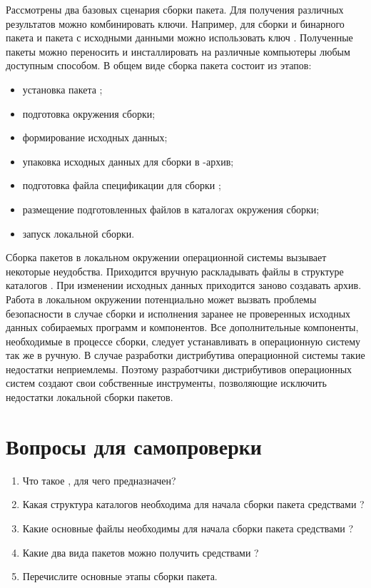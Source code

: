 Рассмотрены два базовых сценария сборки пакета. Для получения различных результатов можно комбинировать ключи.
Например, для сборки и бинарного пакета и пакета с исходными данными можно использовать ключ .
Полученные пакеты можно переносить и инсталлировать на различные компьютеры любым доступным способом.
В общем виде сборка пакета состоит из этапов:
\begin{itemize}
\item установка пакета ;
\item подготовка окружения сборки;
\item формирование исходных данных;
\item упаковка исходных данных для сборки в -архив;
\item подготовка файла спецификации для сборки ;
\item размещение подготовленных файлов в каталогах окружения сборки;
\item запуск локальной сборки.
\end{itemize}

Сборка пакетов в локальном окружении операционной системы вызывает некоторые неудобства.
Приходится вручную раскладывать файлы в структуре каталогов . При изменении
исходных данных приходится заново создавать архив. Работа в локальном окружении потенциально
может вызвать проблемы безопасности в случае сборки и исполнения заранее не проверенных исходных
данных собираемых программ и компонентов. Все дополнительные компоненты, необходимые
в процессе сборки, следует устанавливать в операционную систему так же в ручную.
В случае разработки дистрибутива операционной системы такие недостатки неприемлемы.
Поэтому разработчики дистрибутивов операционных систем создают свои собственные инструменты,
позволяющие исключить недостатки локальной сборки пакетов.

\section{Вопросы для самопроверки}

\begin{enumerate}
	\item Что такое , для чего предназначен?
	\item Какая структура каталогов необходима для начала сборки пакета средствами ?
	\item Какие основные файлы необходимы для начала сборки пакета средствами ?
	\item Какие два вида пакетов можно получить средствами ?
	\item Перечислите основные этапы сборки пакета.
\end{enumerate}
